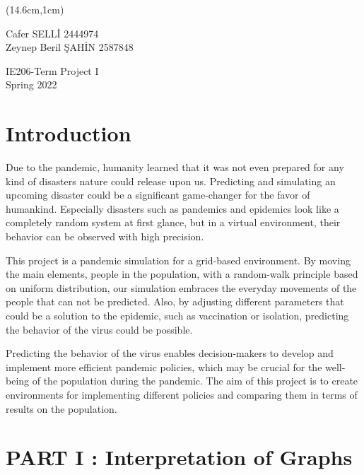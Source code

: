 \documentclass{article}
\begin{document}
\begin{textblock*}{6cm}(14.6cm,1cm) %
    \begin{flushright}
    \normalsize Cafer SELLİ 2444974\\\normalsize Zeynep Beril ŞAHİN 2587848    
    \end{flushright}
\end{textblock*}

\begin{center}
\huge IE206-Term Project I\\\Large Spring 2022
\end{center}


\tableofcontents


\section*{Introduction}

\; \; Due to the pandemic, humanity learned that it was not even prepared for any kind of disasters nature could release upon us. Predicting and simulating an upcoming disaster could be a significant game-changer for the favor of humankind. Especially disasters such as pandemics and epidemics look like a completely random system at first glance, but in a virtual environment, their behavior can be observed with high precision.

This project is a pandemic simulation for a grid-based environment. By moving the main elements, people in the population, with a random-walk principle based on uniform distribution, our simulation embraces the everyday movements of the people that can not be predicted. Also, by adjusting different parameters that could be a solution to the epidemic, such as vaccination or isolation, predicting the behavior of the virus could be possible.

Predicting the behavior of the virus enables decision-makers to develop and implement more efficient pandemic policies, which may be crucial for the well-being of the population during the pandemic. The aim of this project is to create environments for implementing different policies and comparing them in terms of results on the population.

\section*{PART I : Interpretation of Graphs}
\end{document}
